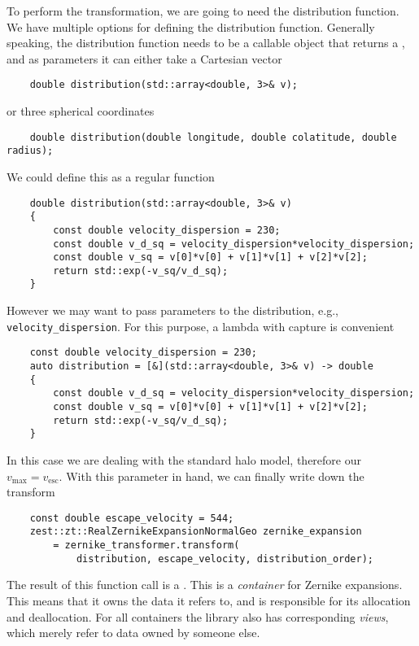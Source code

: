 \documentclass{article}
\begin{document}
To perform the transformation, we are going to need the distribution function. We have multiple options for defining the distribution function. Generally speaking, the distribution function needs to be a callable object that returns a , and as parameters it can either take a Cartesian vector
\begin{verbatim}
    double distribution(std::array<double, 3>& v);
\end{verbatim}
or three spherical coordinates
\begin{verbatim}
    double distribution(double longitude, double colatitude, double radius);
\end{verbatim}
We could define this as a regular function
\begin{verbatim}
    double distribution(std::array<double, 3>& v)
    {
        const double velocity_dispersion = 230;
        const double v_d_sq = velocity_dispersion*velocity_dispersion;
        const double v_sq = v[0]*v[0] + v[1]*v[1] + v[2]*v[2];
        return std::exp(-v_sq/v_d_sq);
    }
\end{verbatim}
However we may want to pass parameters to the distribution, e.g., \texttt{velocity\_dispersion}. For this purpose, a lambda with capture is convenient
\begin{verbatim}
    const double velocity_dispersion = 230;
    auto distribution = [&](std::array<double, 3>& v) -> double
    {
        const double v_d_sq = velocity_dispersion*velocity_dispersion;
        const double v_sq = v[0]*v[0] + v[1]*v[1] + v[2]*v[2];
        return std::exp(-v_sq/v_d_sq);
    }
\end{verbatim}

In this case we are dealing with the standard halo model, therefore our $v_\text{max}=v_\text{esc}$. With this parameter in hand, we can finally write down the transform
\begin{verbatim}
    const double escape_velocity = 544;
    zest::zt::RealZernikeExpansionNormalGeo zernike_expansion
        = zernike_transformer.transform(
            distribution, escape_velocity, distribution_order);
\end{verbatim}
The result of this function call is a . This is a \emph{container} for Zernike expansions. This means that it owns the data it refers to, and is responsible for its allocation and deallocation. For all containers the library also has corresponding \emph{views}, which merely refer to data owned by someone else.
\end{document}
